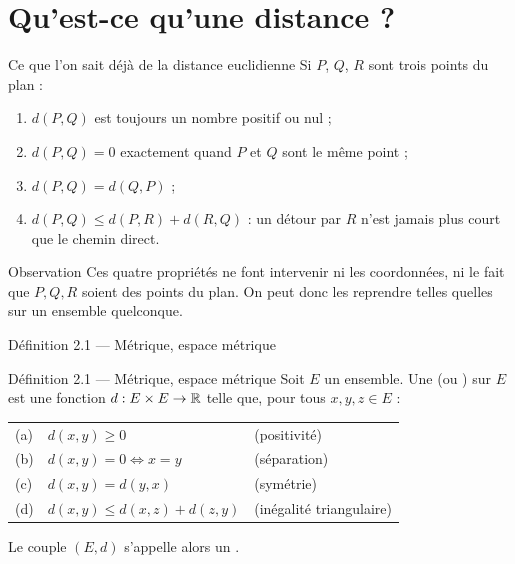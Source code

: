 \section{Qu'est-ce qu'une distance ?}

\begin{frame}{Ce que l'on sait déjà de la distance euclidienne}
  Si $P$, $Q$, $R$ sont trois points du plan :
  \begin{enumerate}
    \item $d(P,Q)$ est toujours un nombre positif ou nul ;
    \item $d(P,Q) = 0$ exactement quand $P$ et $Q$ sont le même point ;
    \item $d(P,Q) = d(Q,P)$ ;
    \item $d(P,Q) \leq d(P,R) + d(R,Q)$ : un détour par $R$ n'est jamais
      plus court que le chemin direct.
  \end{enumerate}
  \vspace{6pt}
  \begin{Rem}{Observation}
    Ces quatre propriétés ne font intervenir ni les
    coordonnées, ni le fait que $P,Q,R$ soient des points du plan. On
    peut donc les reprendre telles quelles sur un ensemble quelconque.
  \end{Rem}
\end{frame}

\begin{frame}{Définition 2.1 --- Métrique, espace métrique}
  \begin{Enonce}{Définition 2.1 --- Métrique, espace métrique}
    Soit $E$ un ensemble. Une  (ou ) sur
    $E$ est une fonction $d : E\times E\to\operatorname{\mathbb{R}}$ telle que, pour tous
    $x,y,z\in E$ :
    \begin{center}
    \begin{tabular}{lll}
      (a) & $d(x,y)\geq 0$ & (positivité) \\
      (b) & $d(x,y)=0 \iff x=y$ & (séparation) \\
      (c) & $d(x,y)=d(y,x)$ & (symétrie) \\
      (d) & $d(x,y)\leq d(x,z)+d(z,y)$ & (inégalité triangulaire)
    \end{tabular}
    \end{center}
    Le couple $(E,d)$ s'appelle alors un .
  \end{Enonce}
\end{frame}

